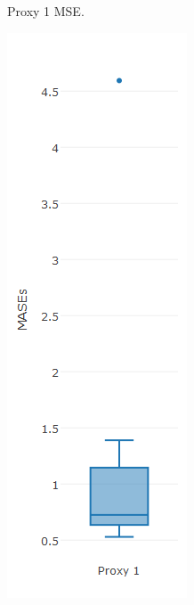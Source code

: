 \begin{figure}[!h]
{\begin{subfigure}{.25\linewidth}
  \caption{Proxy 1 MSE.}
  \label{fig:bp1b}
\end{subfigure}%
\begin{subfigure}{.25\linewidth}
  \centering
  \includegraphics[width=\linewidth]{img/6msigmaMasebp.png}

\end{subfigure}}
\end{figure}
